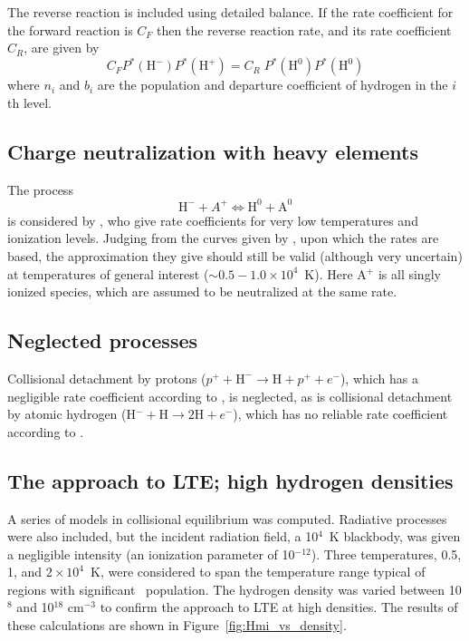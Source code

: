 The reverse reaction is included using detailed balance.  If the rate
coefficient for the forward reaction is $C_F$ then the reverse reaction rate,
and its rate coefficient $C_R$, are given by
\begin{equation}
{C_F}{P^*}({{\mathrm{H}}^ - }){P^*}({{\mathrm{H}}^ + }) =
{C_R}\;{P^*}({{\mathrm{H}}^0}){P^*}({{\mathrm{H}}^0})
\end{equation}
where $n_i$ and $b_i$ are the population and departure coefficient of hydrogen
in the $i$th level.

\subsection{Charge neutralization with heavy elements}

The process
\begin{equation}
{{\mathrm{H}}^ - } + {A^ + } \Leftrightarrow {{\mathrm{H}}^{\mathrm{0}}} +
{{\mathrm{A}}^{\mathrm{0}}}
\end{equation}
is considered by \citet{Dalgarno1973}, who give rate coefficients
for very low temperatures and ionization levels.  Judging from the curves
given by \citet{Peterson1971}, upon which the \citet{Dalgarno1973} rates
are based, the approximation they give should still be valid (although very
uncertain) at temperatures of general interest ($\sim 0.5 - 1.0 \times
10^4$~K).  Here
A$^+$ is all singly ionized species, which are assumed to be neutralized at
the same rate.

\subsection{Neglected processes}

Collisional detachment by protons ($p^+ + \mathrm{H}^- \to \mathrm{H} +p^+ + e^-$), which has a
negligible rate coefficient according to \citet{Janev1987}, is neglected,
as is collisional detachment by atomic hydrogen (H$^- + \mathrm{H} \to 2\mathrm{H}
+ e^-$), which
has no reliable rate coefficient according to
\citet{Lites1984}.

\subsection{The approach to LTE; high hydrogen densities}

A series of models in collisional equilibrium was computed.  Radiative
processes were also included, but the incident radiation field, a 10$^4$~K
blackbody, was given a negligible intensity (an ionization parameter of
10$^{-12}$).  Three temperatures, 0.5, 1, and $2 \times 10^4$~K, were considered to span
the temperature range typical of regions with significant \hminus\ population.
The hydrogen density was varied between 10$^8$ and 10$^{18}$ cm$^{-3}$ to confirm the
approach to LTE at high densities.  The results of these calculations are
shown in Figure~\ref{fig:Hmi_vs_density}.

